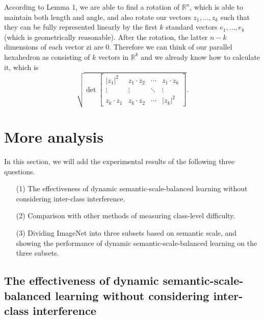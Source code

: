 \documentclass[10pt]{article} %
\begin{document}
According to Lemma 1, we are able to find a rotation of $\mathbb{R}^n$, which is able to maintain both length and angle, and also rotate our vectors ${{z_1}, \ldots ,{z_k}}$ such that they can be fully represented linearly by the first $k$ standard vectors ${{e_1}, \ldots ,{e_k}}$ (which is geometrically reasonable). After the rotation, the latter $n\!-\!k$ dimensions of each vector zi are 0. Therefore we can think of our parallel hexahedron as consisting of $k$ vectors in $\mathbb{R}^k$ and we already know how to calculate it, which is \[\sqrt {\det \left[\!\! {\begin{array}{*{20}{c}}
{{{\left| {{z_1}} \right|}^2}}&{{z_1} \cdot {z_2}}& \cdots &{{z_1} \cdot {z_k}}\\
 \vdots & \vdots & \ddots & \vdots \\
{{z_k} \cdot {z_1}}&{{z_k} \cdot {z_2}}& \cdots &{{{\left| {{z_k}} \right|}^2}}
\end{array}} \!\!\right]}. \]






\section{More analysis \label{H}}

In this section, we will add the experimental results of the following three questions. 

\begin{itemize}
    \item[(1)] The effectiveness of dynamic semantic-scale-balanced learning without considering inter-class interference.
    \item[(2)] Comparison with other methods of measuring class-level difficulty.
    \item[(3)] Dividing ImageNet into three subsets based on semantic scale, and showing the performance of dynamic semantic-scale-balanced learning on the three subsets.
\end{itemize}

\subsection{The effectiveness of dynamic semantic-scale-balanced learning without considering inter-class interference\label{H.1}}
\end{document}

